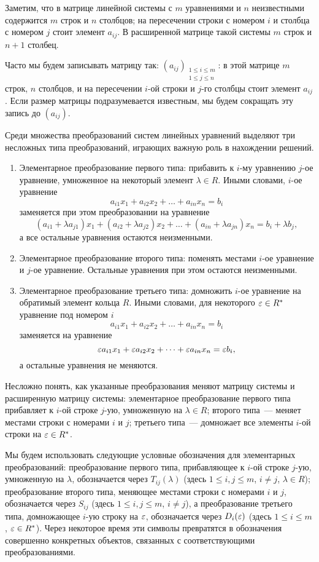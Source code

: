 Заметим, что в матрице линейной системы с $m$ уравнениями и $n$
неизвестными содержится $m$ строк и $n$ столбцов; на пересечении
строки с номером $i$ и столбца с номером $j$ стоит элемент $a_{ij}$. В
расширенной матрице такой системы $m$ строк и $n+1$ столбец.

Часто мы будем записывать матрицу так: $(a_{ij})_{\substack{1\leq
    i\leq m\\1\leq j\leq n}}$: в этой матрице $m$ строк, $n$ столбцов,
и на пересечении $i$-ой строки и $j$-го столбцы стоит элемент
$a_{ij}$. Если размер матрицы подразумевается известным, мы будем
сокращать эту запись до $(a_{ij})$.

Среди множества преобразований систем линейных уравнений выделяют три
несложных типа преобразований, играющих важную роль в нахождении
решений.

\begin{enumerate}
\item Элементарное преобразование первого типа: прибавить к $i$-му
  уравнению $j$-ое уравнение, умноженное на некоторый элемент
  $\lambda\in R$. Иными словами, $i$-ое уравнение
$$
a_{i1}x_1+a_{i2}x_2+\dots+a_{in}x_n=b_i
$$
заменяется при этом преобразовании на уравнение
$$
(a_{i1}+\lambda a_{j1})x_1+(a_{i2}+\lambda a_{j2})x_2+\dots
+ (a_{in}+\lambda a_{jn})x_n=b_i+\lambda b_j,
$$
а все остальные уравнения остаются неизменными.
\item Элементарное преобразование второго типа: поменять местами
  $i$-ое уравнение и $j$-ое уравнение. Остальные уравнения при этом
  остаются неизменными.
\item Элементарное преобразование третьего типа: домножить $i$-ое
  уравнение на обратимый элемент кольца $R$. Иными словами, для
  некоторого $\varepsilon\in R^*$ уравнение под номером $i$
$$
a_{i1}x_1+a_{i2}x_2+\dots+a_{in}x_n=b_i
$$
заменяется на уравнение
$$
\varepsilon a_{i1}x_1+\varepsilon a_{i2}x_2+\dots+\varepsilon a_{in}x_n=\varepsilon b_i,
$$
а остальные уравнения не меняются.
\end{enumerate}
Несложно понять, как указанные преобразования меняют матрицу системы и
расширенную матрицу системы: элементарное преобразование первого типа
прибавляет к $i$-ой строке $j$-ую, умноженную на $\lambda\in R$;
второго типа~--- меняет местами строки с номерами $i$ и $j$; третьего
типа~--- домножает все элементы $i$-ой строки на $\varepsilon\in R^*$.

Мы будем использовать следующие условные обозначения для элементарных
преобразований: преобразование первого типа, прибавляющее к $i$-ой
строке $j$-ую, умноженную на $\lambda$, обозначается через
$T_{ij}(\lambda)$ (здесь $1\leq i,j\leq m$, $i\neq j$, $\lambda\in
R$); преобразование второго типа, меняющее местами строки с номерами
$i$ и $j$, обозначается через $S_{ij}$ (здесь $1\leq i,j\leq m$,
$i\neq j$), а преобразование третьего
типа, домножающее $i$-ую строку на $\varepsilon$, обозначается через
$D_i(\varepsilon)$ (здесь $1\leq i\leq m$, $\varepsilon\in R^*$). Через некоторое
время эти символы превратятся в обозначения совершенно конкретных
объектов, связанных с соответствующими преобразованиями.

